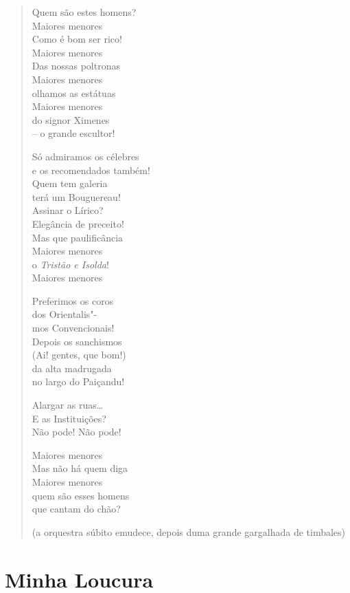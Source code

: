 \begin{verse}
Quem são estes homens?\\
Maiores menores\\
Como é bom ser rico!\\
Maiores menores\\
Das nossas poltronas\\
Maiores menores\\
olhamos as estátuas\\
Maiores menores\\
do signor Ximenes\\
-- o grande escultor!

Só admiramos os célebres\\
e os recomendados também!\\
Quem tem galeria\\
terá um Bouguereau!\\
Assinar o Lírico?\\
Elegância de preceito!\\
Mas que paulificância\\
Maiores menores\\
o \emph{Tristão e Isolda}!\\
Maiores menores

Preferimos os coros\\
dos Orientalis"-\\
mos Convencionais!\\
Depois os sanchismos\\
(Ai! gentes, que bom!)\\
da alta madrugada\\
no largo do Paiçandu!

Alargar as ruas\ldots{}\\
E as Instituições?\\
Não pode! Não pode!

Maiores menores\\
Mas não há quem diga\\
Maiores menores\\
quem são esses homens\\
que cantam do chão?

\hfill{}(a orquestra súbito emudece, depois duma grande gargalhada de timbales)
\end{verse}

\section*{Minha Loucura}

